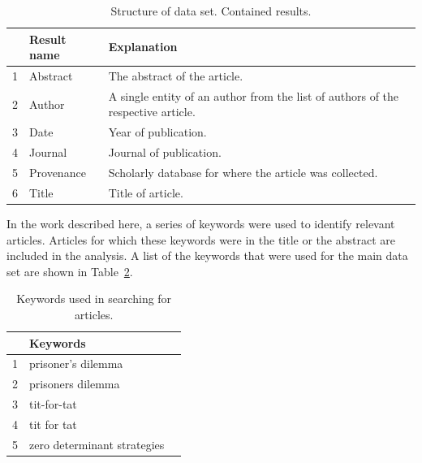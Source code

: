 \documentclass{article}
\theoremstyle{definition}
\begin{document}
\begin{table}[!hbtp]
    \begin{center}
        \begin{tabular}{lll}
            \toprule
             & Result name & Explanation \\
             \midrule
             1 & Abstract & The abstract of the article.\\ 
             2 & Author & A single entity of an author from the list of
             authors of the respective article.\\ 
             3 & Date & Year of publication.\\ 
             4 & Journal & Journal of publication.\\ 
             5 & Provenance & Scholarly database for where the article was
             collected.\\ 
             6 & Title & Title of article.\\ 
            \bottomrule
        \end{tabular}
    \end{center}
    \caption{Structure of data set. Contained results.}
    \label{table:result_set}
\end{table}

In the work described here, a series of keywords were used to identify relevant
articles. Articles for which these keywords were in the title or the abstract
are included in the analysis. A list of the keywords that were used for the main
data set are shown in Table~\ref{table:search_keywords}.

\begin{table}[!hbtp]
    \begin{center}
        \begin{tabular}{lll}
            \toprule
             & Keywords & \\
            \midrule
             1 &  prisoner's dilemma & \\
             2 &  prisoners dilemma  & \\
             3 &  tit-for-tat & \\
             4 &  tit for tat & \\
             5 &  zero determinant strategies & \\
            \bottomrule
        \end{tabular}
    \end{center}
    \caption{Keywords used in searching for articles.}
    \label{table:search_keywords}
\end{table}
\end{document}
